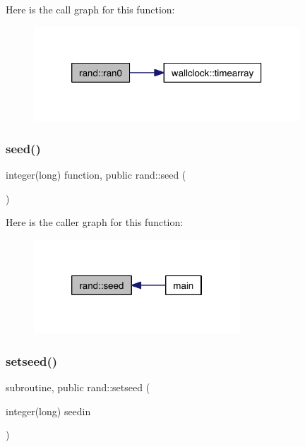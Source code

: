 Here is the call graph for this function\+:\nopagebreak
\begin{figure}[H]
\begin{center}
\leavevmode
\includegraphics[width=282pt]{namespacerand_a750567ffa303a800f86ffc3bd5705137_cgraph}
\end{center}
\end{figure}
\mbox{\label{namespacerand_a0bf2019d6e29304bea88b6dfc7277e96}} 
\subsubsection{\texorpdfstring{seed()}{seed()}}
{\footnotesize\ttfamily integer(long) function, public rand\+::seed (\begin{DoxyParamCaption}{ }\end{DoxyParamCaption})}

Here is the caller graph for this function\+:\nopagebreak
\begin{figure}[H]
\begin{center}
\leavevmode
\includegraphics[width=218pt]{namespacerand_a0bf2019d6e29304bea88b6dfc7277e96_icgraph}
\end{center}
\end{figure}
\mbox{\label{namespacerand_a632224183164f720bd47baa916a5ab8b}} 
\subsubsection{\texorpdfstring{setseed()}{setseed()}}
{\footnotesize\ttfamily subroutine, public rand\+::setseed (\begin{DoxyParamCaption}\item[{integer(long)}]{seedin }\end{DoxyParamCaption})}



